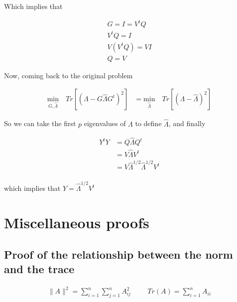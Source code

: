 \documentclass{article}
\begin{document}
    Which implies that

    \begin{equation*}
        \begin{aligned}
        G = I = V^tQ\\
        V^tQ = I\\
        V(V^tQ) = VI\\
        Q = V
        \end{aligned}
    \end{equation*}

    Now, coming back to the original problem

    \begin{equation*}
        \begin{aligned}
            \underset{G,\hat{\Lambda}}{\text{min}} \quad Tr[(\Lambda - G \hat{\Lambda} G^t)^2]
            &=
            \underset{\hat{\Lambda}}{\text{min}} \quad Tr[(\Lambda - \hat{\Lambda})^2]
        \end{aligned}
    \end{equation*}

    So we can take the first $p$ eigenvalues of $\Lambda$ to define $\hat{\Lambda}$,
    and finally

    \begin{equation*}
        \begin{aligned}
            Y^tY &= Q \hat{\Lambda} Q^t\\
            &=
            V \hat{\Lambda} V^t\\
            &=
            V \hat{\Lambda}^{1/2} \hat{\Lambda}^{1/2} V^t\\
        \end{aligned}
    \end{equation*}

    which implies that $Y = \hat{\Lambda}^{1/2} V^t$

    \section{Miscellaneous proofs}

    \subsection{Proof of the relationship between the norm and the trace} \label{norm_trace}

    \begin{equation*}
        \begin{aligned}
            \lVert A \rVert^2 = \sum_{i=1}^n \sum_{j=1}^n A_{ij}^2
            \hspace{1cm}
            Tr(A) = \sum_{i=1}^n A_{ii}
        \end{aligned}
    \end{equation*}\\
\end{document}
